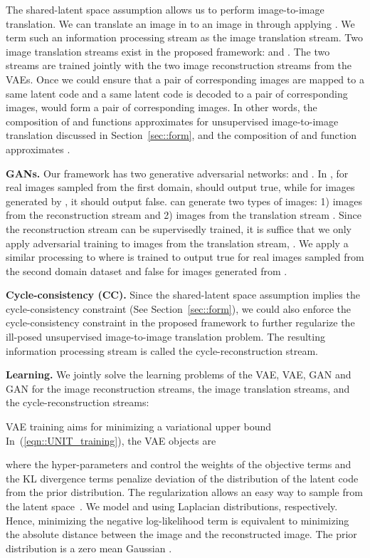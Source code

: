 \documentclass{article}
\begin{document}
The shared-latent space assumption allows us to perform image-to-image translation. We can translate an image  in  to an image in  through applying . We term such an information processing stream as the image translation stream. Two image translation streams exist in the proposed framework:  and . The two streams are trained jointly with the two image reconstruction streams from the VAEs. Once we could ensure that a pair of corresponding images are mapped to a same latent code and a same latent code is decoded to a pair of corresponding images,  would form a pair of corresponding images. In other words, the composition of  and  functions approximates  for unsupervised image-to-image translation discussed in Section~\ref{sec::form}, and the composition of  and  function approximates .


{\bf GANs.} Our framework has two generative adversarial networks:  and . In , for real images sampled from the first domain,  should output true, while for images generated by , it should output false.  can generate two types of images: 1) images from the reconstruction stream  and 2) images from the translation stream . Since the reconstruction stream can be supervisedly trained, it is suffice that we only apply adversarial training to images from the translation stream, . We apply a similar processing to  where  is trained to output true for real images sampled from the second domain dataset and false for images generated from .

{\bf Cycle-consistency (CC).} Since the shared-latent space assumption implies the cycle-consistency constraint (See Section~\ref{sec::form}), we could also enforce the cycle-consistency constraint in the proposed framework to further regularize the ill-posed unsupervised image-to-image translation problem. The resulting information processing stream is called the cycle-reconstruction stream.

{\bf Learning.} We jointly solve the learning problems of the VAE, VAE, GAN and GAN for the image reconstruction streams, the image translation streams, and the cycle-reconstruction streams: 

VAE training aims for minimizing a variational upper bound In~(\ref{eqn::UNIT_training}), the VAE objects are 

where the hyper-parameters  and  control the weights of the objective terms and the KL divergence terms penalize deviation of the distribution of the latent code from the prior distribution. The regularization allows an easy way to sample from the latent space~\cite{kingma2013auto}. We model  and  using Laplacian distributions, respectively. Hence, minimizing the negative log-likelihood term is equivalent to minimizing the absolute distance between the image and the reconstructed image. The prior distribution is a zero mean Gaussian .
\end{document}

